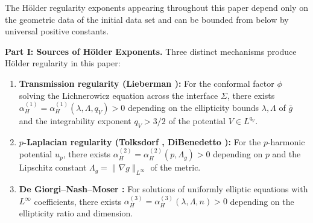 \begin{proposition}\label{prop:HolderExplicit}
The H\"older regularity exponents appearing throughout this paper depend only on the geometric data of the initial data set and can be bounded from below by universal positive constants.

\textbf{Part I: Sources of H\"older Exponents.}
Three distinct mechanisms produce H\"older regularity in this paper:

\begin{enumerate}
    \item \textbf{Transmission regularity (Lieberman \cite{lieberman1988}):} For the conformal factor $\phi$ solving the Lichnerowicz equation across the interface $\Sigma$, there exists $\alpha_H^{(1)} = \alpha_H^{(1)}(\lambda, \Lambda, q_V) > 0$ depending on the ellipticity bounds $\lambda, \Lambda$ of $\bar{g}$ and the integrability exponent $q_V > 3/2$ of the potential $V \in L^{q_V}$.
    
    \item \textbf{$p$-Laplacian regularity (Tolksdorf \cite{tolksdorf1984}, DiBenedetto \cite{dibenedetto1993}):} For the $p$-harmonic potential $u_p$, there exists $\alpha_H^{(2)} = \alpha_H^{(2)}(p, \Lambda_g) > 0$ depending on $p$ and the Lipschitz constant $\Lambda_g = \|\nabla g\|_{L^\infty}$ of the metric.
    
    \item \textbf{De Giorgi--Nash--Moser \cite{gilbarg2001}:} For solutions of uniformly elliptic equations with $L^\infty$ coefficients, there exists $\alpha_H^{(3)} = \alpha_H^{(3)}(\lambda, \Lambda, n) > 0$ depending on the ellipticity ratio and dimension.
\end{enumerate}


\end{proposition}
